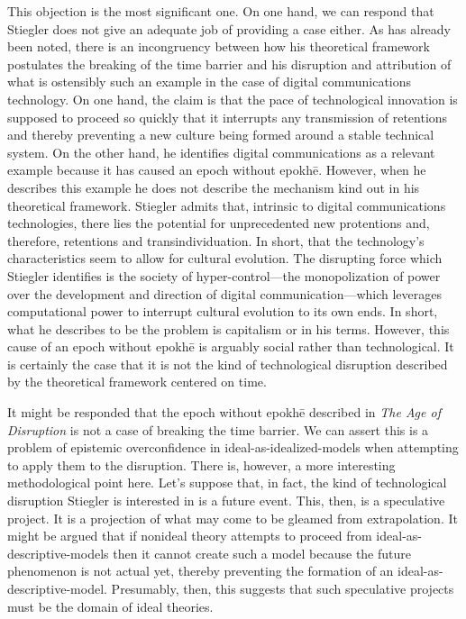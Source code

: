\documentclass[letterpaper,notitlepage,12pt]{article}
\begin{document}
This objection is the most significant one.
On one hand, we can respond that Stiegler does not give an adequate job of
providing a case either.
As has already been noted, there is an incongruency between how his theoretical
framework postulates the breaking of the time barrier and his disruption and
attribution of what is ostensibly such an example in the case of digital
communications technology.
On one hand, the claim is that the pace of technological innovation is supposed
to proceed so quickly that it interrupts any transmission of retentions and
thereby preventing a new culture being formed around a stable technical system.
On the other hand, he identifies digital communications as a relevant example
because it has caused an epoch without epokh\={e}.
However, when he describes this example he does not describe the mechanism kind
out in his theoretical framework.
Stiegler admits that, intrinsic to digital communications technologies, there
lies the potential for unprecedented new protentions and, therefore, retentions
and transindividuation.
In short, that the technology's characteristics seem to allow for cultural
evolution.
The disrupting force which Stiegler identifies is the society of
hyper-control---the monopolization of power over the development and direction
of digital communication---which leverages computational power to interrupt
cultural evolution to its own ends.
In short, what he describes to be the problem is capitalism or
 in his terms.
However, this cause of an epoch without epokh\={e} is arguably social rather
than technological.
It is certainly the case that it is not the kind of technological disruption
described by the theoretical framework centered on time.

It might be responded that the epoch without epokh\={e} described in \textit{The
Age of Disruption} is not a case of breaking the time barrier.
We can assert this is a problem of epistemic overconfidence in
ideal-as-idealized-models when attempting to apply them to the disruption.
There is, however, a more interesting methodological point here.
Let's suppose that, in fact, the kind of technological disruption Stiegler is
interested in is a future event.
This, then, is a speculative project.
It is a projection of what may come to be gleamed from extrapolation.
It might be argued that if nonideal theory attempts to proceed from
ideal-as-descriptive-models then it cannot create such a model because the
future phenomenon is not actual yet, thereby preventing the formation of an
ideal-as-descriptive-model.
Presumably, then, this suggests that such speculative projects must be the
domain of ideal theories.
\end{document}
